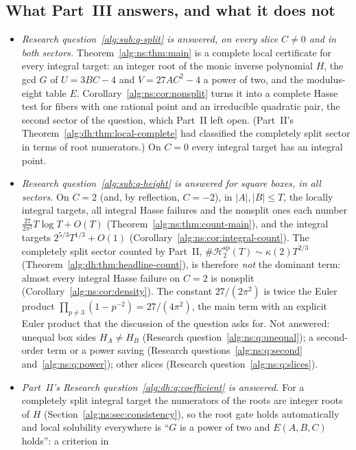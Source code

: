 \documentclass[11pt]{article}
\numberwithin{equation}{section}
\theoremstyle{plain}
\theoremstyle{plain}
\theoremstyle{plain}
\theoremstyle{definition}
\theoremstyle{definition}
\theoremstyle{definition}
\theoremstyle{remark}
\newcommand{\Hsplit}{\mathcal H^{\mathrm{sp}}}
\begin{document}
\subsection{What Part~III answers, and what it does not}\label{alg:ns:sec:answers}
\begin{itemize}[itemsep=2pt,topsep=3pt]
\item \emph{Research question~\ref{alg:sub:q-split} is answered, on every
slice $C\ne0$ and in both sectors.} Theorem~\ref{alg:ns:thm:main} is a
complete local certificate for every integral target: an integer root of
the monic inverse polynomial $H$, the gcd $G$ of $U=3BC-4$ and
$V=27AC^2-4$ a power of two, and the modulus-eight table $E$.
Corollary~\ref{alg:ns:cor:nonsplit} turns it into a complete Hasse test
for fibers with one rational point and an irreducible quadratic pair,
the second sector of the question, which Part~II left open. (Part~II's
Theorem~\ref{alg:dh:thm:local-complete} had classified the completely
split sector in terms of root numerators.) On $C=0$ every integral target
has an integral point.
\item \emph{Research question~\ref{alg:sub:q-height} is answered for square
boxes, in all sectors.} On $C=2$ (and, by reflection, $C=-2$), in
$|A|,|B|\le T$, the locally integral targets, all integral Hasse failures
and the nonsplit ones each number $\frac{27}{2\pi^2}T\log T+O(T)$
(Theorem~\ref{alg:ns:thm:count-main}), and the integral targets
$2^{5/3}T^{1/3}+O(1)$ (Corollary~\ref{alg:ns:cor:integral-count}). The
completely split sector counted by Part~II,
$\#\Hsplit_2(T)\sim\kappa(2)T^{2/3}$
(Theorem~\ref{alg:dh:thm:headline-count}), is therefore \emph{not} the
dominant term: almost every integral Hasse failure on $C=2$ is nonsplit
(Corollary~\ref{alg:ns:cor:density}). The constant $27/(2\pi^2)$ is twice
the Euler product $\prod_{p\ne3}(1-p^{-2})=27/(4\pi^2)$, the main term
with an explicit Euler product that the discussion of the question asks
for. Not answered: unequal box sides $H_A\ne H_B$ (Research
question~\ref{alg:ns:q:unequal}); a second-order term or a power saving
(Research questions~\ref{alg:ns:q:second} and~\ref{alg:ns:q:power}); other
slices (Research question~\ref{alg:ns:q:slices}).
\item \emph{Part~II's Research question~\ref{alg:dh:q:coefficient} is
answered.} For a completely split integral target the numerators of the
roots are integer roots of $H$ (Section~\ref{alg:ns:sec:consistency}), so
the root gate holds automatically and local solubility everywhere is
``$G$ is a power of two and $E(A,B,C)$ holds'': a criterion in

\end{itemize}
\end{document}
